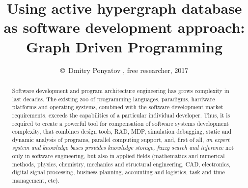 

\title{
Using active hypergraph database\\
as software development approach:\\
\Huge{Graph Driven Programming}}

\author{\small{\copyright\ Dmitry Ponyatov , free researcher, 2017}}


\maketitle
\begin{abstract}\noindent
Software development and program architecture engineering has grows complexity
in last decades. The existing zoo of programming languages, para\-digms,
hardware platforms and operating systems, combined with the software development
market requirements, exceeds the capabilities of a particular individual
developer. Thus, it is required to create a powerful tool for compensation of
software systems development complexity, that combines design tools, RAD, MDP,
simulation debugging, static and dynamic analysis of programs, parallel
computing support, and, first of all, \emph{an expert system and knowledge bases
provides knowledge storage, fuzzy search and inference} not only in software
engineering, but also in applied fields (mathematics and numerical methods,
physics, chemistry, mechanics and structural engineering, CAD, electronics,
digital signal processing, business planning, accounting and logistics, task and
time management, etc).
\end{abstract}

\tableofcontents\secdown\secdown




% 








\listoffigures





